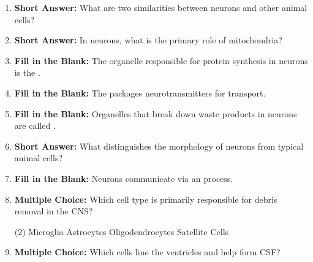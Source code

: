 \begin{enumerate}[label=\textbf{Q2.1.\arabic*}]
      \item \textbf{Short Answer:} What are two similarities between neurons and other animal cells? \\
      \item \textbf{Short Answer:} In neurons, what is the primary role of mitochondria? \\
      \item \textbf{Fill in the Blank:} The organelle responsible for protein synthesis in neurons is the \underline{\hspace{3cm}}. \\
      \item \textbf{Fill in the Blank:} The \underline{\hspace{3cm}} packages neurotransmitters for transport. \\
      \item \textbf{Fill in the Blank:} Organelles that break down waste products in neurons are called \underline{\hspace{3cm}}. \\
      \item \textbf{Short Answer:} What distinguishes the morphology of neurons from typical animal cells? \\
      \item \textbf{Fill in the Blank:} Neurons communicate via an \underline{\hspace{3cm}} process. \\
      \item \textbf{Multiple Choice:} Which cell type is primarily responsible for debris removal in the CNS?
            \begin{tasks}[label=\textcolor{draculafg}{(\Alph*)}, item-format=\color{draculafg}, label-width=1.5em, item-indent=1.7em](2)
                  \task Microglia
                  \task Astrocytes
                  \task Oligodendrocytes
                  \task Satellite Cells
            \end{tasks}
      \item \textbf{Multiple Choice:} Which cells line the ventricles and help form CSF?

\end{enumerate}
